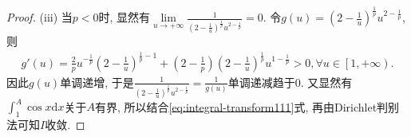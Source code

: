 \documentclass[../../main.tex]{subfiles}%
\begin{document}
\begin{proof}
(iii) 当$p<0$时, 显然有$\underset{u\rightarrow +\infty}{\lim}\frac{1}{\left( 2-\frac{1}{u} \right) ^{\frac{1}{p}}u^{2-\frac{1}{p}}}=0$. 令$g\left( u \right) =\left( 2-\frac{1}{u} \right) ^{\frac{1}{p}}u^{2-\frac{1}{p}}$, 则
\begin{align*}
g'\left( u \right) =\frac{2}{p}u^{-\frac{1}{p}}\left( 2-\frac{1}{u} \right) ^{\frac{1}{p}-1}+\left( 2-\frac{1}{p} \right) \left( 2-\frac{1}{u} \right) ^{\frac{1}{p}}u^{1-\frac{1}{p}}>0,\forall u\in \left[ 1,+\infty \right).
\end{align*}
因此$g\left( u \right)$单调递增, 于是$\frac{1}{\left( 2-\frac{1}{u} \right) ^{\frac{1}{p}}u^{2-\frac{1}{p}}}=\frac{1}{g\left( u \right)}$单调递减趋于$0$. 又显然有$\int_1^A{\cos x\mathrm{d}x}$关于$A$有界, 所以结合\eqref{eq:integral-transform111}式, 再由Dirichlet判别法可知$I$收敛.

\end{proof}
\end{document}
